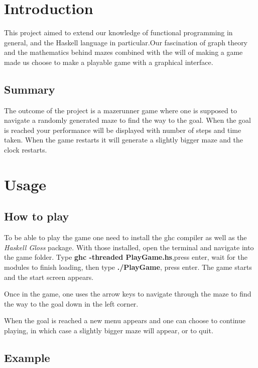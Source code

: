 \documentclass[12pt, a4paper]{article}
\begin{document}
\maketitle

\newpage


\tableofcontents


\newpage
\section{Introduction}
This project aimed to extend our knowledge of functional programming in general, and the Haskell language in particular.Our fascination of graph theory and the mathematics behind mazes combined with the will of making a game made us choose to make a playable game with a graphical interface.


\subsection{Summary}
The outcome of the project is a mazerunner game where one is supposed to navigate a randomly generated maze to find the way to the goal. When the goal is reached your performance will be displayed with number of steps and time taken. When the game restarts it will generate a slightly bigger maze and the clock restarts.


\section{Usage}
\subsection{How to play}
To be able to play the game one need to install the ghc compiler as well as the \textit{Haskell Gloss} package. With those installed, open the terminal and navigate into the game folder. Type \textbf{ghc -threaded PlayGame.hs},press enter, wait for the modules to finish loading, then type \textbf{./PlayGame}, press enter. The game starts and the start screen appears.


Once in the game, one uses the arrow keys to navigate through the maze to find the way to the goal down in the left corner. 

When the goal is reached a new menu appears and one can choose to continue playing, in which case a slightly bigger maze will appear, or to quit.


\subsection{Example}
\end{document}
